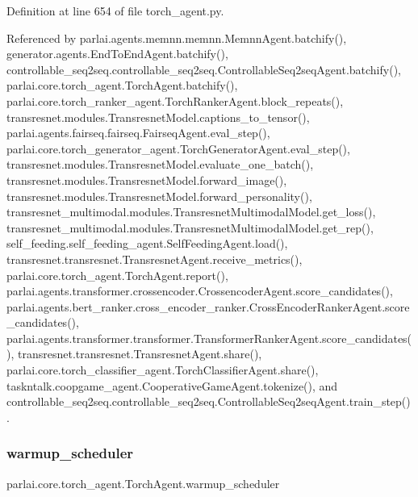 Definition at line 654 of file torch\+\_\+agent.\+py.



Referenced by parlai.\+agents.\+memnn.\+memnn.\+Memnn\+Agent.\+batchify(), generator.\+agents.\+End\+To\+End\+Agent.\+batchify(), controllable\+\_\+seq2seq.\+controllable\+\_\+seq2seq.\+Controllable\+Seq2seq\+Agent.\+batchify(), parlai.\+core.\+torch\+\_\+agent.\+Torch\+Agent.\+batchify(), parlai.\+core.\+torch\+\_\+ranker\+\_\+agent.\+Torch\+Ranker\+Agent.\+block\+\_\+repeats(), transresnet.\+modules.\+Transresnet\+Model.\+captions\+\_\+to\+\_\+tensor(), parlai.\+agents.\+fairseq.\+fairseq.\+Fairseq\+Agent.\+eval\+\_\+step(), parlai.\+core.\+torch\+\_\+generator\+\_\+agent.\+Torch\+Generator\+Agent.\+eval\+\_\+step(), transresnet.\+modules.\+Transresnet\+Model.\+evaluate\+\_\+one\+\_\+batch(), transresnet.\+modules.\+Transresnet\+Model.\+forward\+\_\+image(), transresnet.\+modules.\+Transresnet\+Model.\+forward\+\_\+personality(), transresnet\+\_\+multimodal.\+modules.\+Transresnet\+Multimodal\+Model.\+get\+\_\+loss(), transresnet\+\_\+multimodal.\+modules.\+Transresnet\+Multimodal\+Model.\+get\+\_\+rep(), self\+\_\+feeding.\+self\+\_\+feeding\+\_\+agent.\+Self\+Feeding\+Agent.\+load(), transresnet.\+transresnet.\+Transresnet\+Agent.\+receive\+\_\+metrics(), parlai.\+core.\+torch\+\_\+agent.\+Torch\+Agent.\+report(), parlai.\+agents.\+transformer.\+crossencoder.\+Crossencoder\+Agent.\+score\+\_\+candidates(), parlai.\+agents.\+bert\+\_\+ranker.\+cross\+\_\+encoder\+\_\+ranker.\+Cross\+Encoder\+Ranker\+Agent.\+score\+\_\+candidates(), parlai.\+agents.\+transformer.\+transformer.\+Transformer\+Ranker\+Agent.\+score\+\_\+candidates(), transresnet.\+transresnet.\+Transresnet\+Agent.\+share(), parlai.\+core.\+torch\+\_\+classifier\+\_\+agent.\+Torch\+Classifier\+Agent.\+share(), taskntalk.\+coopgame\+\_\+agent.\+Cooperative\+Game\+Agent.\+tokenize(), and controllable\+\_\+seq2seq.\+controllable\+\_\+seq2seq.\+Controllable\+Seq2seq\+Agent.\+train\+\_\+step().

\mbox{\label{classparlai_1_1core_1_1torch__agent_1_1TorchAgent_a54d8632c546ab621c93c34f13c964726}} 
\subsubsection{\texorpdfstring{warmup\+\_\+scheduler}{warmup\_scheduler}}
{\footnotesize\ttfamily parlai.\+core.\+torch\+\_\+agent.\+Torch\+Agent.\+warmup\+\_\+scheduler}



